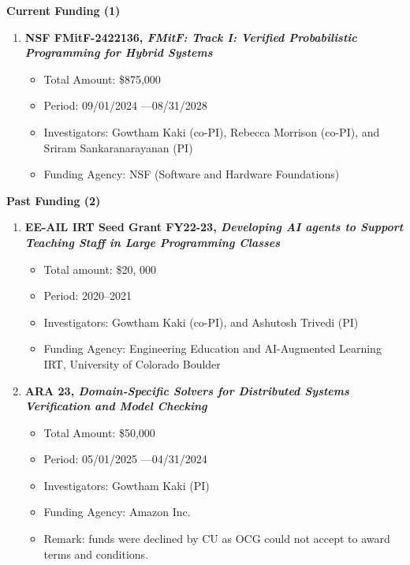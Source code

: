 \documentclass{article}
\begin{document}
\medskip

\noindent\textbf{Current Funding (1)}

\begin{enumerate}

\item {\bf NSF FMitF-2422136, \emph{FMitF: Track I: Verified Probabilistic Programming for Hybrid Systems}}
\begin{itemize}
  \item 
    Total Amount: \$875,000
  \item 
    Period: 09/01/2024 ---08/31/2028
\item 
    Investigators: Gowtham Kaki (co-PI), Rebecca Morrison (co-PI), and
    Sriram Sankaranarayanan (PI)
\item 
Funding Agency: NSF (Software and Hardware Foundations)
\end{itemize}  
\end{enumerate}

\medskip

\noindent\textbf{Past Funding (2) }
\begin{enumerate}
  \item {\bf EE-AIL IRT Seed Grant FY22-23, \emph{Developing AI agents to Support Teaching Staff in Large Programming Classes}}
  \begin{itemize}
  \item
    Total amount: \$20, 000
  \item  
    Period: 2020--2021
  \item Investigators:
   Gowtham Kaki (co-PI), and Ashutosh Trivedi (PI)
  \item Funding Agency: Engineering Education and AI-Augmented Learning IRT, University of Colorado Boulder
  \end{itemize}

  \item {\bf ARA 23, \emph{Domain-Specific Solvers for Distributed Systems
Verification and Model Checking}}
  \begin{itemize}
    \item 
      Total Amount: \$50,000
    \item 
      Period: 05/01/2025 ---04/31/2024
    \item 
      Investigators: Gowtham Kaki (PI)
    \item 
      Funding Agency: Amazon Inc.
    \item Remark: funds were declined by CU as OCG could not accept to award terms and conditions.
\end{itemize}  
\end{enumerate}
\end{document}
